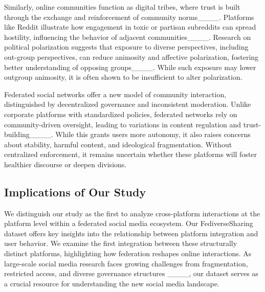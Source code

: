 Similarly, online communities function as digital tribes, where trust is built through the exchange and reinforcement of community norms____. Platforms like Reddit illustrate how engagement in toxic or partisan subreddits can spread hostility, influencing the behavior of adjacent communities____. Research on political polarization suggests that exposure to diverse perspectives, including out-group perspectives, can reduce animosity and affective polarization, fostering better understanding of opposing groups____. While such exposure may lower outgroup animosity, it is often shown to be insufficient to alter polarization.

Federated social networks offer a new model of community interaction, distinguished by decentralized governance and inconsistent moderation. Unlike corporate platforms with standardized policies, federated networks rely on community-driven oversight, leading to variations in content regulation and trust-building____. While this grants users more autonomy, it also raises concerns about stability, harmful content, and ideological fragmentation. Without centralized enforcement, it remains uncertain whether these platforms will foster healthier discourse or deepen divisions.

\subsection{Implications of Our Study}
We distinguish our study as the first to analyze cross-platform interactions at the platform level within a federated social media ecosystem. Our FediverseSharing dataset offers key insights into the relationship between platform integration and user behavior. We examine the first integration between these structurally distinct platforms, highlighting how federation reshapes online interactions. As large-scale social media research faces growing challenges from fragmentation, restricted access, and diverse governance structures ____, our dataset serves as a crucial resource for understanding the new social media landscape.











